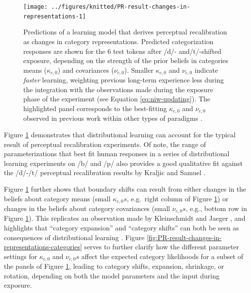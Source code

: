 \documentclass[
  11pt,
  man,floatsintext]{apa6}
\begin{document}
\begin{figure}

{\centering \texttt{[image: ../figures/knitted/PR-result-changes-in-representations-1]} 

}

\caption{Predictions of a learning model that derives perceptual recalibration as changes in category representations. Predicted categorization responses are shown for the 6 test tokens after /d/- and/t/-shifted exposure, depending on the strength of the prior beliefs in categories means (\(\kappa_{c,0}\)) and covariances (\(\nu_{c,0}\)). Smaller \(\kappa_{c,0}\) and \(\nu_{c,0}\) indicate \emph{faster} learning, weighting previous long-term experience less during the integration with the observations made during the exposure phase of the experiment (see Equation \eqref{eq:niw-updating}). The highlighted panel corresponds to the best-fitting \(\kappa_{c,0}\) and \(\nu_{c,0}\) observed in previous work within other types of paradigms \autocite{kleinschmidt-jaeger2016cogsci,kleinschmidt2020}.}\label{fig:PR-result-changes-in-representations}
\end{figure}

Figure \ref{fig:PR-result-changes-in-representations} demonstrates that distributional learning can account for the typical result of perceptual recalibration experiments. Of note, the range of parameterizations that best fit human responses in a series of distributional learning experiments on /b/ and /p/ \autocite[gray panel in Figure \ref{fig:PR-result-changes-in-representations}, \(\kappa_{/b/,0}=\kappa_{/p/,0}=160\) (95\% CI: 75-780) and \(\nu_{/b/,0}=\nu_{/p/,0}=510\) (95\% CI: 160-1000),][]{kleinschmidt2020} also provides a good qualitative fit against the /d/-/t/ perceptual recalibration results by Kraljic and Samuel \autocite*{kraljic-samuel2007}.

Figure \ref{fig:PR-result-changes-in-representations} further shows that boundary shifts can result from either changes in the beliefs about category means (small \(\kappa_{c,0}s\), e.g.~right column of Figure \ref{fig:PR-result-changes-in-representations}) or changes in the beliefs about category covariances (small \(\nu_{c,0}s\), e.g., bottom row in Figure \ref{fig:PR-result-changes-in-representations}). This replicates an observation made by Kleinschmidt and Jaeger \autocites*[p.~168]{kleinschmidt-jaeger2015}[see also][]{hitczenko-feldman2016,theodore-monto2019}, and highlights that ``category expansion'' and ``category shifts'' can both be seen as consequences of distributional learning \autocites[see also][]{bent-baeseberk2021,schertz-clare2020,hitczenko-feldman2016}. Figure \ref{fig:PR-result-changes-in-representations-categories} serves to further clarify how the different parameter settings for \(\kappa_{c,0}\) and \(\nu_{c,0}s\) affect the expected category likelihoods for a subset of the panels of Figure \ref{fig:PR-result-changes-in-representations}, leading to category shifts, expansion, shrinkage, or rotation, depending on both the model parameters and the input during exposure.
\end{document}
